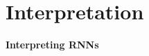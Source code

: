 \documentclass{beamer}
\let\tempone\itemize
\let\temptwo\enditemize
\renewenvironment{itemize}{\tempone\addtolength{\itemsep}{0.5\baselineskip}}{\temptwo}
\newcommand{\air}{\vspace{0.25cm}}
\newcommand{\Cite}[1]{{\footnotesize \citep{#1}}}
\begin{document}


    










    


\section{Interpretation}

\begin{frame}
  \begin{center}
    \textbf{Interpreting RNNs}
  \end{center}
\end{frame}
\end{document}
